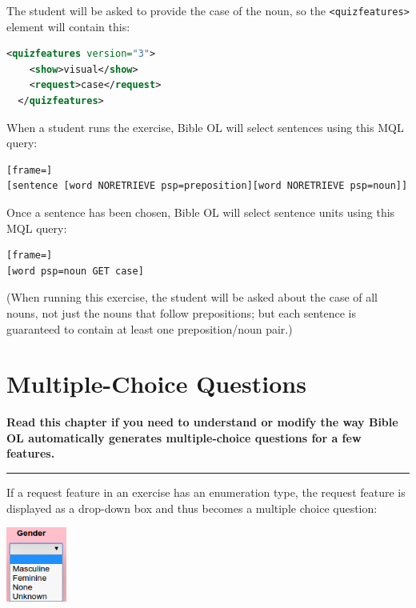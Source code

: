 \documentclass[11pt,oneside,a4paper]{memoir}
\newcommand*{\xml}[1]{\texttt{<#1>}}
\begin{document}
The student will be asked to provide the case of the noun, so the
\xml{quizfeatures}\index{quizfeatures@\xml{quizfeatures}} element will contain this:


\begin{lstlisting}[language=XML]
  <quizfeatures version="3">
    <show>visual</show>
    <request>case</request>
  </quizfeatures>
\end{lstlisting}


When a student runs the exercise, Bible OL will select sentences using this MQL query:

\begin{lstlisting}[frame=]
[sentence [word NORETRIEVE psp=preposition][word NORETRIEVE psp=noun]]
\end{lstlisting}

Once a sentence has been chosen, Bible OL will select sentence units%
 using this MQL query:

\begin{lstlisting}[frame=]
[word psp=noun GET case]
\end{lstlisting}

(When running this exercise, the student will be asked about the case of all nouns, not just the
nouns that follow prepositions; but each sentence is guaranteed to contain at least one
preposition/noun pair.)

\chapter{Multiple-Choice Questions}\label{chap-multiple-choice}

\textbf{Read this chapter if you need to understand or modify the way Bible OL automatically
  generates multiple-choice questions for a few features.}
\plainbreak{3}


If a request feature in an exercise has an
enumeration type, the request feature is displayed as a drop-down box and
thus becomes a multiple choice question:

\begin{center}
  \includegraphics[width=0.148\textwidth]{gender.png}
\end{center}
\end{document}
